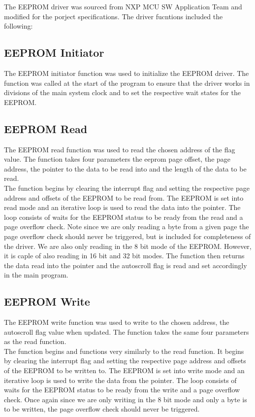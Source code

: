 \documentclass{article}
\begin{document}
The EEPROM driver was sourced from NXP MCU SW Application Team and modified for the porject specifications. The driver fucntions included the following:

\subsection{EEPROM Initiator}
The EEPROM initiator function was used to initialize the EEPROM driver. The function was called at the start of the program to ensure that the driver works in divisions of the main system clock and to set the respective wait states for the EEPROM. 

\subsection{EEPROM Read}
The EEPROM read function was used to read the chosen address of the flag value. The function takes four parameters the eeprom page offset, the page address, the pointer to the data to be read into and the length of the data to be read.\\

The function begins by clearing the interrupt flag and setting the respective page address and offsets of the EEPROM to be read from. The EEPROM is set into read mode and an iterative loop is used to read the data into the pointer. The loop consists of waits for the EEPROM status to be ready from the read and a page overflow check. Note since we are only reading a byte from a given page the page overflow check should never be triggered, but is included for completeness of the driver. We are also only reading in the 8 bit mode of the EEPROM. However, it is caple of also reading in 16 bit and 32 bit modes. The function then returns the data read into the pointer and the autoscroll flag is read and set accordingly in the main program.

\subsection{EEPROM Write}
The EEPROM write function was used to write to the chosen address, the autoscroll flag value when updated. The function takes the same four parameters as the read function.\\

The function begins and functions very similarly to the read function. It begins by clearing the interrupt flag and setting the respective page address and offsets of the EEPROM to be written to. The EEPROM is set into write mode and an iterative loop is used to write the data from the pointer. The loop consists of waits for the EEPROM status to be ready from the write and a page overflow check. Once again since we are only writing in the 8 bit mode and only a byte is to be written, the page overflow check should never be triggered. \\
\end{document}
